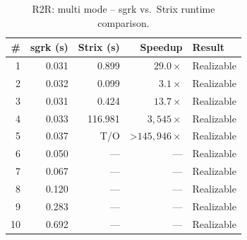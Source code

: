 \begin{table}[htbp]
\centering
\caption{R2R: multi mode -- sgrk vs.\ Strix runtime comparison.}
\label{tab:R2R_multi_mode}
\begin{tabular}{r r r r l}
\toprule
\# & sgrk (s) & Strix (s) & Speedup & Result \\
\midrule
1 & 0.031 & 0.899 & $29.0\times$ & Realizable \\
2 & 0.032 & 0.099 & $3.1\times$ & Realizable \\
3 & 0.031 & 0.424 & $13.7\times$ & Realizable \\
4 & 0.033 & 116.981 & $3,545\times$ & Realizable \\
5 & 0.037 & T/O & >$145,946\times$ & Realizable \\
6 & 0.050 & --- & --- & Realizable \\
7 & 0.067 & --- & --- & Realizable \\
8 & 0.120 & --- & --- & Realizable \\
9 & 0.283 & --- & --- & Realizable \\
10 & 0.692 & --- & --- & Realizable \\
\bottomrule
\end{tabular}
\end{table}
